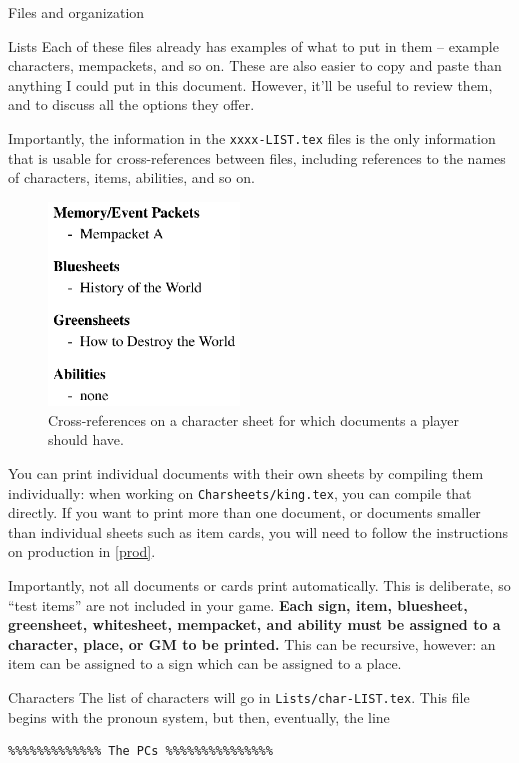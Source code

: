 \documentclass[sheet]{GameTexBase}
\begin{document}
\begin{section}{Files and organization}
\begin{subsection}{Lists}
Each of these files already has examples of what to put in them -- example characters, mempackets, and so on.  These are also easier to copy and paste than anything I could put in this document.
However, it'll be useful to review them, and to discuss all the options they offer.

Importantly, the information in the \lstinline{xxxx-LIST.tex} files is the only information that is usable for cross-references between files, including references to the names of characters, items, abilities, and so on.

\begin{figure}
\centering
\includegraphics[width=2in]{charsheet-crossref}
\caption{Cross-references on a character sheet for which documents a player should have.}
\end{figure}

You can print individual documents with their own sheets by compiling them individually: when working on \lstinline|Charsheets/king.tex|, you can compile that directly.  If you want to print more than one document, or documents smaller than individual sheets such as item cards, you will need to follow the instructions on production in \ref{prod}.

Importantly, not all documents or cards print automatically.  This is deliberate, so ``test items'' are not included in your game.  \textbf{Each sign, item, bluesheet, greensheet, whitesheet, mempacket, and ability must be assigned to a character, place, or GM to be printed.}
This can be recursive, however: an item can be assigned to a sign which can be assigned to a place.  
\end{subsection}
\begin{subsection}{Characters}
\label{charlist}
The list of characters will go in \lstinline|Lists/char-LIST.tex|.  This file begins with the pronoun system, but then, eventually, the line
\begin{verbatim}
%%%%%%%%%%%%% The PCs %%%%%%%%%%%%%%%
\end{verbatim}


\end{subsection}
\end{section}
\end{document}

